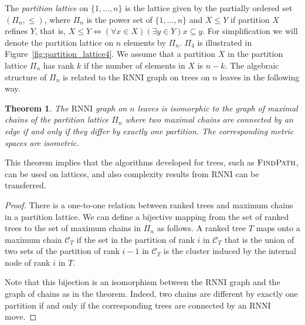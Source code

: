 \documentclass[11pt]{amsart}
\newtheorem{theorem}{Theorem}
\newcommand{\rnni}{\mathrm{RNNI}}
\newcommand{\findpath}{\textsc{FindPath}}
\begin{document}
The \emph{partition lattice} on $\{1, \ldots, n\}$ is the lattice given by the partially ordered set $(\Pi_n, \leq)$, where $\Pi_n$ is the power set of $\{1, \ldots, n\}$ and $X \leq Y$ if partition $X$ refines $Y$, that is, $X \leq Y \Leftrightarrow (\forall x \in X)(\exists y \in Y) x \subseteq y$.
For simplification we will denote the partition lattice on $n$ elements by $\Pi_n$.
$\Pi_4$ is illustrated in Figure~\ref{fig:partition_lattice4}.
We assume that a partition $X$ in the partition lattice $\Pi_n$ has rank $k$ if the number of elements in $X$ is $n-k$.
The algebraic structure of $\Pi_n$ is related to the $\rnni$ graph on trees on $n$ leaves in the following way.

\begin{theorem}
The $\rnni$ graph on $n$ leaves is isomorphic to the graph of maximal chains of the partition lattice $\Pi_n$ where two maximal chains are connected by an edge if and only if they differ by exactly one partition.
The corresponding metric spaces are isometric.
\label{thm:partition_lattice}
\end{theorem}

This theorem implies that the algorithms developed for trees, such as $\findpath$, can be used on lattices, and also complexity results from $\rnni$ can be transferred.

\begin{proof}
There is a one-to-one relation between ranked trees and maximum chains in a partition lattice.
We can define a bijective mapping from the set of ranked trees to the set of maximum chains in $\Pi_n$ as follows.
A ranked tree $T$ maps onto a maximum chain $\mathcal{C}_T$ if the set in the partition of rank $i$ in $\mathcal{C}_T$ that is the union of two sets of the partition of rank $i-1$ in $\mathcal{C}_T$ is the cluster induced by the internal node of rank $i$ in $T$.

Note that this bijection is an isomorphism between the $\rnni$ graph and the graph of chains as in the theorem.
Indeed, two chains are different by exactly one partition if and only if the corresponding trees are connected by an $\rnni$ move.
\end{proof}
\end{document}
